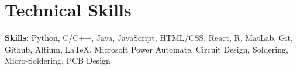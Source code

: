 \documentclass[letterpaper,11pt]{article}
\begin{document}
\section{Technical Skills}
 \begin{itemize}[leftmargin=0.22in, label={}]
    \small{\item{
     \textbf{Skills}{: Python, C/C++, Java, JavaScript, HTML/CSS, React, R, MatLab, Git, Github, Altium, LaTeX, Microsoft Power Automate, Circuit Design, Soldering, Micro-Soldering, PCB Design} \\
    }}
 \end{itemize}


\end{document}

